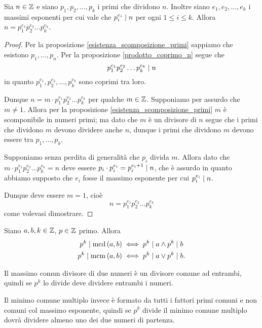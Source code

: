 \begin{theorem}
    Sia $n \in \mathbb{Z}$ e siano $p_1, p_2, \dots, p_k$ i primi che dividono $n$. Inoltre siano $e_1, e_2, \dots, e_k$ i massimi esponenti per cui vale che $p_i^{e_i} \mid n$ per ogni $1 \leq i \leq k$. Allora $n = p_1^{e_1}p_2^{e_2} \dots p_k^{e_k}$.
\end{theorem}
\begin{proof}
    Per la proposizione \ref{esistenza_scomposizione_primi} sappiamo che esistono $p_1, \dots, p_n$. Per la proposizione \ref{prodotto_coprimo_n} segue che \[
        p_1^{e_1}p_2^{e_2} \dots p_k^{e_k} \mid n    
    \]
    in quanto $p_1^{e_1}, p_2^{e_2}, \dots, p_k^{e_k}$ sono coprimi tra loro.

    Dunque $n = m \cdot p_1^{e_1}p_2^{e_2} \dots p_k^{e_k}$ per qualche $m \in \mathbb{Z}$.
    Supponiamo per assurdo che $m \neq 1$. Allora per la proposizione \ref{esistenza_scomposizione_primi} $m$ è scomponibile in numeri primi; ma dato che $m$ è un divisore di $n$ segue che i primi che dividono $m$ devono dividere anche $n$, dunque i primi che dividono $m$ devono essere tra $p_1, \dots, p_k$. 

    Supponiamo senza perdita di generalità che $p_i$ divida $m$. Allora dato che $m \cdot p_1^{e_1}p_2^{e_2} \dots p_k^{e_k} = n$ deve essere $p_i \cdot p_i^{e_i} = p_i^{e_i+1} \mid n$, che è assurdo in quanto abbiamo supposto che $e_i$ fosse il massimo esponente per cui $p_i^{e_i} \mid n$. 
    
    Dunque deve essere $m = 1$, cioè \[
        n = p_1^{e_1}p_2^{e_2} \dots p_k^{e_k}
    \]
    come volevasi dimostrare.
\end{proof}

\begin{proposition}\label{mcd_mcm_in_termini_di_divisori_primi}
    Siano $a, b, k \in \mathbb{Z}$, $p \in \mathbb{Z}$ primo. Allora
    \begin{alignat}{1}
        p^k \mid \operatorname{mcd}\left(a, b\right) &\iff p^k \mid a \land p^k \mid b \\ 
        p^k \mid \operatorname{mcm}\left(a, b\right) &\iff p^k \mid a \lor p^k \mid b.
    \end{alignat}
\end{proposition}
\begin{intuition}
    Il massimo comun divisore di due numeri è un divisore comune ad entrambi, quindi se $p^k$ lo divide deve dividere entrambi i numeri.

    Il minimo comune multiplo invece è formato da tutti i fattori primi comuni e non comuni col massimo esponente, quindi se $p^k$ divide il minimo comune multiplo dovrà dividere almeno uno dei due numeri di partenza.
\end{intuition}

